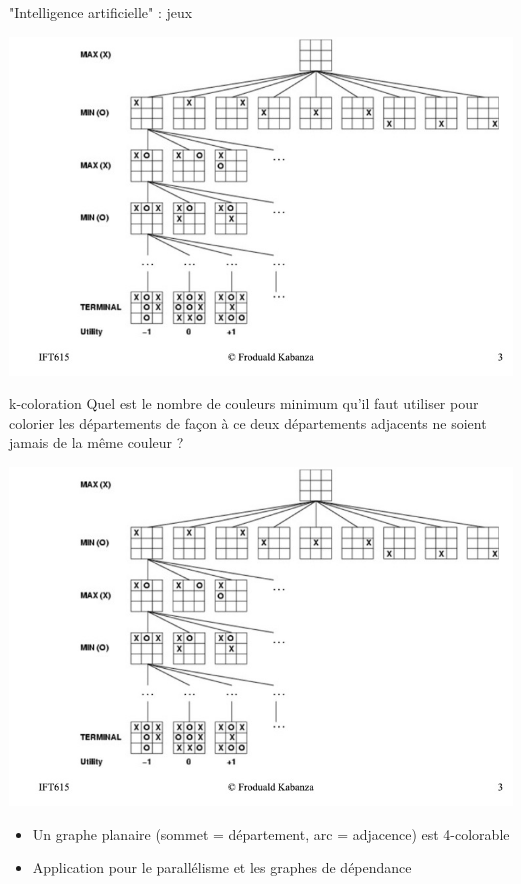 \begin{frame}{"Intelligence artificielle" : jeux}
    \begin{center}
        \includegraphics[width=.9\textwidth]{fig/morpion.jpg}
    \end{center} 
\end{frame}

\begin{frame}{k-coloration}
Quel est le nombre de couleurs minimum qu'il faut utiliser pour colorier les départements de façon à ce deux départements adjacents ne soient jamais de la même couleur ?
\begin{center}
    \includegraphics[width=.5\textwidth]{fig/morpion.jpg}
\end{center} 
\begin{itemize}
    \item Un graphe planaire (sommet = département, arc = adjacence) est 4-colorable 
    \item Application pour le parallélisme et les graphes de dépendance 
\end{itemize}
\end{frame}